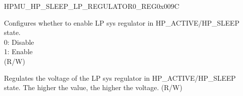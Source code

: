 \begin{register}{H}{PMU\_HP\_SLEEP\_LP\_REGULATOR0\_REG}{0x009C}\label{regdesc:PMUHPSLEEPLPREGULATOR0REG}
%
%
%
%
\regnewline%
\begin{regdesc}\begin{reglist}
\label{fielddesc:PMUHPSLEEPLPREGULATORXPD}\item [PMU\_HP\_SLEEP\_LP\_REGULATOR\_XPD] Configures whether to enable LP sys regulator in HP\_ACTIVE/HP\_SLEEP state. \\
0: Disable \\
1: Enable \\
(R/W)

\label{fielddesc:PMUHPSLEEPLPREGULATORDBIAS}\item [PMU\_HP\_SLEEP\_LP\_REGULATOR\_DBIAS] Regulates the voltage of the LP sys regulator in HP\_ACTIVE/HP\_SLEEP state. The higher the value, the higher the voltage. (R/W)
\end{reglist}\end{regdesc}
\end{register}


